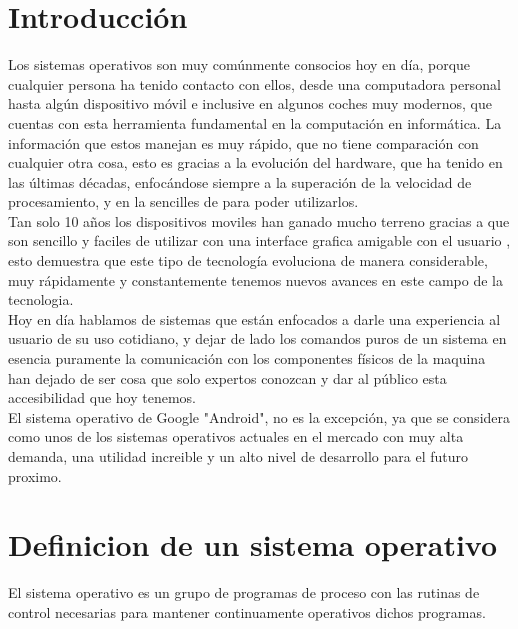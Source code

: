 \documentclass{bmcart}
\begin{document}
\newpage
\section*{Introducción}

Los sistemas operativos son muy comúnmente consocios hoy en día, porque cualquier persona ha tenido contacto con ellos, desde una computadora personal hasta algún dispositivo móvil e inclusive en algunos coches muy modernos, que cuentas con esta herramienta fundamental en la computación en informática.
La información que estos manejan es muy rápido, que no tiene comparación con cualquier otra cosa, esto es gracias a la evolución del hardware, que ha tenido en las últimas décadas, enfocándose siempre a la superación de la velocidad de procesamiento, y en la sencilles de para poder utilizarlos. \\

Tan solo 10 años los dispositivos moviles han ganado mucho terreno gracias a que son sencillo y faciles de utilizar con una interface grafica amigable con el usuario , esto demuestra que este tipo de tecnología evoluciona de manera considerable, muy rápidamente y constantemente tenemos nuevos avances en este campo de la tecnologia.\\

Hoy en día hablamos de sistemas que están enfocados a darle una experiencia al usuario de su uso cotidiano, y dejar de lado los comandos puros de un sistema en esencia puramente la comunicación con los componentes físicos de la maquina han dejado de ser cosa que solo expertos conozcan y dar al público esta accesibilidad que hoy tenemos.\\

El sistema operativo de Google "Android", no es la excepción, ya que se considera como unos de los sistemas operativos actuales en el mercado con muy alta demanda, una utilidad increible y un alto nivel de desarrollo para el futuro proximo.

\newpage

\section*{Definicion de un sistema operativo}

 El sistema operativo es un grupo de programas de proceso con las rutinas de
 control necesarias para mantener continuamente
 operativos dichos programas.
 
\end{document}
